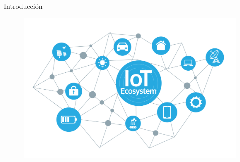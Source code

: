 \begin{frame}[t]{Introducci\'on}\vspace{10pt}

\begin{figure}
	\includegraphics[scale=0.2]{Images/iot.png}
\end{figure}

\end{frame}